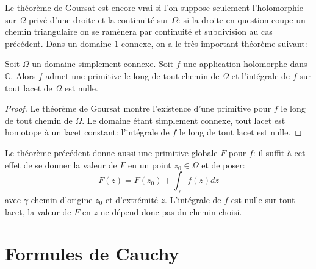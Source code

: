 Le théorème de Goursat est encore vrai si l'on suppose seulement l'holomorphie
sur $\Omega$ privé d'une droite et la continuité sur $\Omega$: si la droite en
question coupe un chemin triangulaire on se ramènera par continuité et
subdivision au cas précédent. Dans un domaine $1$-connexe, on a le très important théorème suivant:

\begin{fthm}
Soit $\Omega$ un domaine simplement connexe. Soit $f$ une application holomorphe
dans $\mathbb{C}$. Alors $f$ admet une primitive le long de tout chemin de
$\Omega$ et l'intégrale de $f$ sur tout lacet de $\Omega$ est nulle.
\end{fthm}

\begin{proof}
Le théorème de Goursat montre l'existence d'une primitive pour $f$ le long de
tout chemin de $\Omega$. Le domaine étant simplement connexe, tout lacet est
homotope à un lacet constant: l'intégrale de $f$ le long de tout lacet est
nulle.
 \end{proof}
 Le théorème précédent donne aussi une primitive globale $F$ pour $f$: il
 suffit à cet effet de se donner la valeur de $F$ en un point $z_0 \in \Omega$
 et de poser:
 \[
 F(z) = F(z_0) + \int_{\gamma} f(z)dz
 \]
 avec $\gamma$ chemin d'origine $z_0$ et d'extrémité $z$. L'intégrale de $f$
 est nulle sur tout lacet, la valeur de $F$ en $z$ ne dépend donc pas du chemin
 choisi.
\section{Formules de Cauchy}

